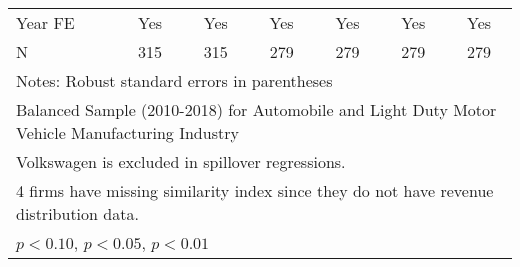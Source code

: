 \begin{table}[htbp]
\begin{tabular}{l*{6}{c}}
Year FE             &         Yes         &         Yes         &         Yes         &         Yes         &         Yes         &         Yes         \\
N                   &         315         &         315         &         279         &         279         &         279         &         279         \\
\bottomrule
\multicolumn{7}{l}{\footnotesize Notes: Robust standard errors in parentheses}\\
\multicolumn{7}{l}{\footnotesize Balanced Sample (2010-2018) for Automobile and Light Duty Motor Vehicle Manufacturing Industry}\\
\multicolumn{7}{l}{\footnotesize Volkswagen is excluded in spillover regressions.}\\
\multicolumn{7}{l}{\footnotesize 4 firms have missing similarity index since they do not have revenue distribution data.}\\
\multicolumn{7}{l}{\footnotesize \sym{*} \(p<0.10\), \sym{**} \(p<0.05\), \sym{***} \(p<0.01\)}\\
\end{tabular}
\end{table}

